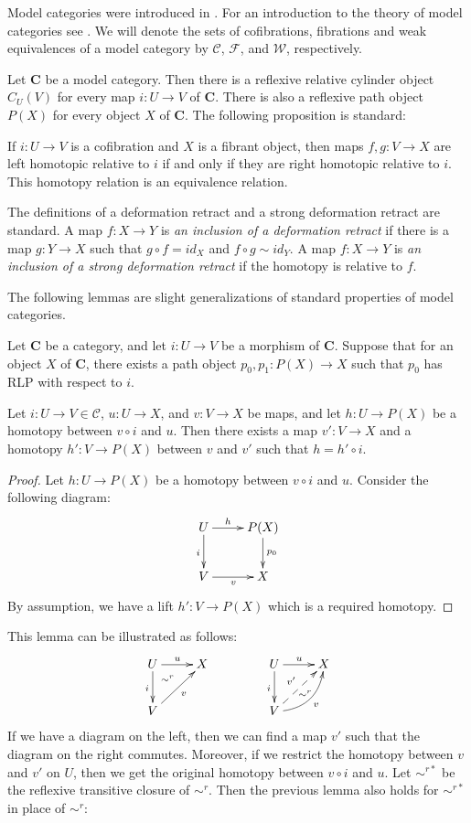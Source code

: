 \documentclass{tac}
\theoremstyle{definition}
\newcommand{\we}{\mathcal{W}}
\newcommand{\fib}{\mathcal{F}}
\newcommand{\cof}{\mathcal{C}}
\newcommand{\cat}[1]{\mathbf{#1}}
\newcommand{\C}{\cat{C}}
\begin{document}
Model categories were introduced in \cite{quillen}.
For an introduction to the theory of model categories see \cite{hirschhorn,hovey}.
We will denote the sets of cofibrations, fibrations and weak equivalences of a model category by $\cof$, $\fib$, and $\we$, respectively.

Let $\C$ be a model category.
Then there is a reflexive relative cylinder object $C_U(V)$ for every map $i : U \to V$ of $\C$.
There is also a reflexive path object $P(X)$ for every object $X$ of $\C$.
The following proposition is standard:
\begin{prop}
If $i : U \to V$ is a cofibration and $X$ is a fibrant object, then maps $f,g : V \to X$ are left homotopic relative to $i$ if and only if they are right homotopic relative to $i$.
This homotopy relation is an equivalence relation.
\end{prop}

The definitions of a deformation retract and a strong deformation retract are standard.
A map $f : X \to Y$ is \emph{an inclusion of a deformation retract} if there is
a map $g : Y \to X$ such that $g \circ f = id_X$ and $f \circ g \sim id_Y$.
A map $f : X \to Y$ is \emph{an inclusion of a strong deformation retract} if the homotopy is relative to $f$.

The following lemmas are slight generalizations of standard properties of model categories.

\begin{lem}
Let $\C$ be a category, and let $i : U \to V$ be a morphism of $\C$.
Suppose that for an object $X$ of $\C$, there exists a path object $p_0,p_1 : P(X) \to X$ such that $p_0$ has RLP with respect to $i$.

Let $i : U \to V \in \cof$, $u : U \to X$, and $v : V \to X$ be maps, and let $h : U \to P(X)$ be a homotopy between $v \circ i$ and $u$.
Then there exists a map $v' : V \to X$ and a homotopy $h' : V \to P(X)$ between $v$ and $v'$ such that $h = h' \circ i$.
\end{lem}
\begin{proof}
Let $h : U \to P(X)$ be a homotopy between $v \circ i$ and $u$.
Consider the following diagram:
\[ \xymatrix{ U \ar[r]^-h \ar[d]_i & P(X) \ar[d]^{p_0} \\
              V \ar[r]_v & X
            } \]
By assumption, we have a lift $h' : V \to P(X)$ which is a required homotopy.
\end{proof}

This lemma can be illustrated as follows:
\[ \xymatrix{ U \ar[r]^u \ar[d]_i \ar@{}[dr]|(.3){\sim^r} & X \\
              V \ar[ur]_v &
            }
\qquad \qquad
   \xymatrix{ U \ar[r]^u \ar[d]_i \ar@{}[dr]|(.62){\sim^r} & X \\
              V \ar@{-->}[ur]^{v'} \ar@/_1pc/[ur]_v &
            } \]
If we have a diagram on the left, then we can find a map $v'$ such that the diagram on the right commutes.
Moreover, if we restrict the homotopy between $v$ and $v'$ on $U$, then we get the original homotopy between $v \circ i$  and $u$.
Let $\sim^{r*}$ be the reflexive transitive closure of $\sim^r$.
Then the previous lemma also holds for $\sim^{r*}$ in place of $\sim^r$:
\end{document}
